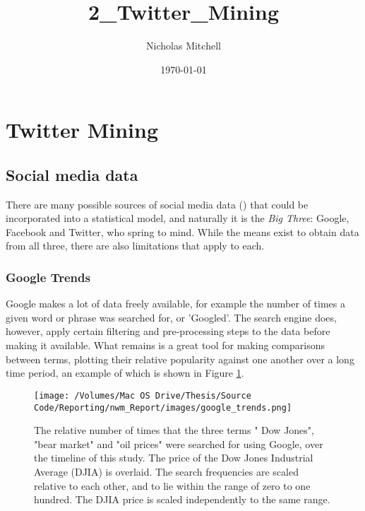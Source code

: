 \documentclass{article}
\author{Nicholas Mitchell}
\date{\today}
\title{2\_Twitter\_Mining}
\begin{document}
\maketitle
\tableofcontents


\section{Twitter Mining}
\label{sec-1}


\subsection{Social media data \label{soc-data}}
\label{sec-1-1}

There are many possible sources of social media data (\cite{russell2013miningSocialMediaData}) that could be incorporated into a statistical model, and naturally it is the \emph{Big Three}: Google, Facebook and Twitter, who spring to mind. While the means exist to obtain data from all three, there are also limitations that apply to each.


\subsubsection{Google Trends}
\label{sec-1-1-1}

Google makes a lot of data freely available, for example the number of times a given word or phrase was searched for, or 'Googled'. The search engine does, however, apply certain filtering and pre-processing steps to the data before making it available. What remains is a great tool for making comparisons between terms, plotting their relative popularity against one another over a long time period, an example of which is shown in Figure \ref{fig:gtrends}.

\begin{figure}[htb]
\centering
\texttt{[image: /Volumes/Mac OS Drive/Thesis/Source Code/Reporting/nwm\_Report/images/google\_trends.png]}
\caption{\label{fig:gtrends}The relative number of times that the three terms " Dow Jones", "bear market" and "oil prices" were searched for using Google, over the timeline of this study. The price of the Dow Jones Industrial Average (DJIA) is overlaid. The search frequencies are scaled relative to each other, and to lie within the range of zero to one hundred. The DJIA price is scaled independently to the same range.}
\end{figure}
\end{document}

